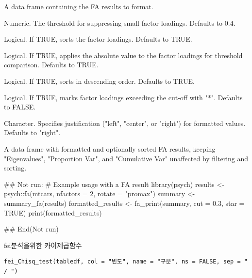 \documentclass[a4paper]{book}
\begin{document}
\begin{Arguments}
\begin{ldescription}
\item[\code{data}] A data frame containing the FA results to format.

\item[\code{cut}] Numeric. The threshold for suppressing small factor loadings. Defaults to 0.4.

\item[\code{sort}] Logical. If TRUE, sorts the factor loadings. Defaults to TRUE.

\item[\code{abs}] Logical. If TRUE, applies the absolute value to the factor loadings for threshold comparison. Defaults to TRUE.

\item[\code{desc}] Logical. If TRUE, sorts in descending order. Defaults to TRUE.

\item[\code{star}] Logical. If TRUE, marks factor loadings exceeding the cut-off with "*". Defaults to FALSE.

\item[\code{justify}] Character. Specifies justification ("left", "center", or "right") for formatted values. Defaults to "right".
\end{ldescription}
\end{Arguments}
%
\begin{Value}
A data frame with formatted and optionally sorted FA results, keeping "Eigenvalues",
"Proportion Var", and "Cumulative Var" unaffected by filtering and sorting.
\end{Value}
%
\begin{Examples}
\begin{ExampleCode}
\#\# Not run: 
# Example usage with a FA result
library(psych)
results <- psych::fa(mtcars, nfactors = 2, rotate = "promax")
summary <- summary_fa(results)
formatted_results <- fa_print(summary, cut = 0.3, star = TRUE)
print(formatted_results)

## End(Not run)
\end{ExampleCode}
\end{Examples}
%
\begin{Description}
fei분석을위한 카이제곱함수
\end{Description}
%
\begin{Usage}
\begin{verbatim}
fei_Chisq_test(tabledf, col = "빈도", name = "구분", ns = FALSE, sep = " / ")
\end{verbatim}
\end{Usage}
\end{document}
